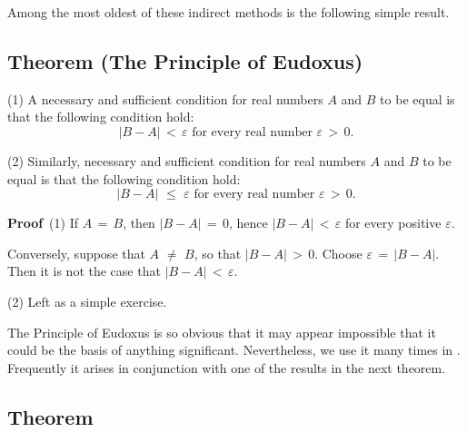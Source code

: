         Among the most oldest of these indirect methods is the following simple result.

\V

            \subsection{\small{\bf Theorem} (The Principle of Eudoxus)}
            \label{ThmB20.63}

\hspace*{\parindent} (1) A necessary and sufficient condition for real numbers $A$ and $B$ to be equal is that the following condition hold:
        \begin{displaymath}
        |B-A|\,<\,{\varepsilon} \mbox{ for every real number ${\varepsilon}\,>\,0$}.
        \end{displaymath}

\V

        (2) Similarly, necessary and sufficient condition for real numbers $A$ and $B$ to be equal is that the following condition hold:
        \begin{displaymath}
        |B-A|\,\,{\leq}\,\,{\varepsilon} \mbox{ for every real number ${\varepsilon}\,>\,0$}.
        \end{displaymath}


\V

        {\bf Proof}\, (1) If $A \,=\, B$, then $|B-A| \,=\, 0$, hence $|B-A|\,<\,{\varepsilon}$ for every positive ${\varepsilon}$.

        Conversely, suppose that $A \,\,{\neq}\,\, B$, so that $|B-A|\,>\,0$.
        Choose ${\varepsilon} \,=\, |B-A|$. Then it is not the case that $|B-A|\,<\,{\varepsilon}$.

\V

        (2) Left as a simple exercise.



\V

        The Principle of Eudoxus is so obvious that it may appear impossible that it could be the basis of anything significant.
    Nevertheless, we use it many times in {\TheseNotes}.
    Frequently it arises in conjunction with one of the results in the next theorem.

\V

            \subsection{\small{\bf Theorem}}
            \label{ThmB20.65}

